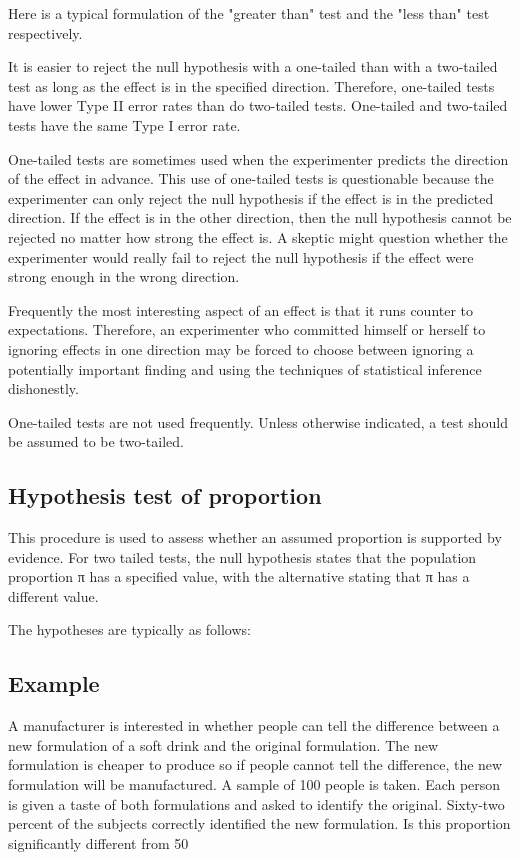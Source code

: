 Here is a typical formulation of the "greater than" test and the "less than" test respectively.
 
         
 
It is easier to reject the null hypothesis with a one-tailed than with a two-tailed test as long as the effect is in the specified direction. Therefore, one-tailed tests have lower Type II error rates than do two-tailed tests.  One-tailed and two-tailed tests have the same Type I error rate. 
 
One-tailed tests are sometimes used when the experimenter predicts the direction of the effect in advance. This use of one-tailed tests is questionable because the experimenter can only reject the null hypothesis if the effect is in the predicted direction. If the effect is in the other direction, then the null hypothesis cannot be rejected no matter how strong the effect is. A skeptic might question whether the experimenter would really fail to reject the null hypothesis if the effect were strong enough in the wrong direction. 
 
Frequently the most interesting aspect of an effect is that it runs counter to expectations. Therefore, an experimenter who committed himself or herself to ignoring effects in one direction may be forced to choose between ignoring a potentially important finding and using the techniques of statistical inference dishonestly. 
 
One-tailed tests are not used frequently. Unless otherwise indicated, a test should be assumed to be two-tailed. 
 



 
 
\subsection*{Hypothesis test of proportion}
This procedure is used to assess whether an assumed proportion is supported by evidence. For two tailed tests, the null hypothesis states that the population proportion  π has a specified value, with the alternative stating that π has a different value.
 
The hypotheses are typically as follows: 
 
\subsection*{Example}
A manufacturer is interested in whether people can tell the difference between a new formulation of a soft drink and the original formulation. The new formulation is cheaper to produce so if people cannot tell the difference, the new formulation will be manufactured. A sample of 100 people is taken. Each person is given a taste of both formulations and asked to identify the original. Sixty-two percent of the subjects correctly identified the new formulation. Is this proportion significantly different from 50%
 
